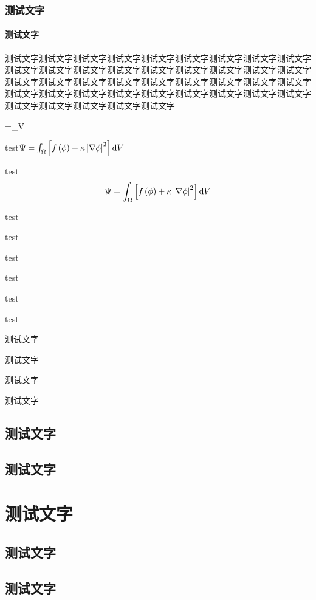 \subsection{测试文字}
\subsubsection{测试文字}


\begin{Example}
	测试文字测试文字测试文字测试文字测试文字测试文字测试文字测试文字测试文字测试文字测试文字测试文字测试文字测试文字测试文字测试文字测试文字测试文字测试文字测试文字测试文字测试文字测试文字测试文字测试文字测试文字测试文字测试文字测试文字测试文字测试文字测试文字测试文字测试文字测试文字测试文字测试文字测试文字测试文字测试文字测试文字
	\begin{flalign}
		\Psi=\int_\Omega{}V
	\end{flalign}
\end{Example}




\Improve
\begin{QuestionItem}[2]
	\item test$\Psi=\int_\Omega\left[f\left(\phi\right)+\kappa\left|\nabla\phi\right|^2\right]{\rm d}V$
	\item test
	$$\Psi=\int_\Omega\left[f\left(\phi\right)+\kappa\left|\nabla\phi\right|^2\right]{\rm d}V$$
	\item test
	\item test
	\item test
	\item test
	\item test
	\item test
\end{QuestionItem}


\Thinking
\begin{QuestionItem}
	\item 测试文字
	\item 测试文字
	\item 测试文字
	\item 测试文字
\end{QuestionItem}






\section{测试文字}

\section{测试文字}


\chapter{测试文字}

\section{测试文字}

\section{测试文字}



